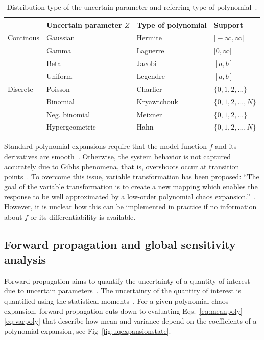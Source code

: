 \begin{table}[hbt!]
\centering
\begin{footnotesize}

\begin{tabular}{llll}
\hline 
 & Uncertain parameter $Z$ & Type of polynomial & Support \\ 
\hline 
Continous & Gaussian & Hermite & $]-\infty, \infty[$ \\ 
 & Gamma & Laguerre & $[0,\infty[$ \\ 
 & Beta & Jacobi & $[a,b]$ \\ 
 & Uniform & Legendre & $[a,b]$ \\ 
Discrete & Poisson & Charlier & $\{0,1,2,...\}$ \\ 
 & Binomial & Kryawtchouk & $\{0,1,2,...,N\}$ \\ 
 & Neg. binomial & Meixner & $\{0,1,2,...\}$ \\ 
 & Hypergeometric & Hahn & $\{0,1,2,...,N\}$ \\ 
\hline 
\end{tabular} 
\end{footnotesize}
\caption{  Distribution type of the uncertain parameter and referring type of polynomial~\cite[p.59]{xiu-2010-math}.  }
\label{tab:polynomials}
\end{table}

Standard polynomial expansions require that the model function $f$ and its derivatives are smooth~\cite{xiu-2009-math,feinberg-2018-cs}. Otherwise, the system behavior is not captured accurately due to Gibbs phenomena, that is, overshoots occur at transition points~\cite{feinberg-2018-cs}. To overcome this issue, variable transformation has been proposed: \enquote{The goal of the variable transformation is to create a new mapping which enables the response to be well approximated by a low-order polynomial chaos expansion.}~\cite{feinberg-2018-cs}. However, it is unclear how this can be implemented in practice if no information about $f$ or its differentiability is available. 


\subsection{Forward propagation and global sensitivity analysis}



Forward propagation aims to quantify the uncertainty of a quantity of interest due to uncertain parameters~\cite{smith-2014-math}. The uncertainty of the quantity of interest is quantified using the statistical moments~\cite[p.187]{smith-2014-math}. For a given polynomial chaos expansion, forward propagation cuts down to evaluating Eqs.~\eqref{eq:meanpoly}-\eqref{eq:varpoly} that describe how mean and variance depend on the coefficients of a polynomial expansion, see Fig~\ref{fig:uqexpansionstate}. 

